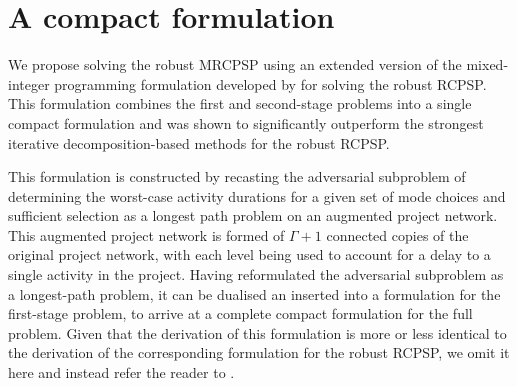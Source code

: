 \documentclass[a4paper,abstracton]{scrartcl}
\begin{document}
\section{A compact formulation}

We propose solving the robust MRCPSP using an extended version of the mixed-integer programming formulation developed by \cite{bold2021compact} for solving the robust RCPSP. This formulation combines the first and second-stage problems into a single compact formulation and was shown to significantly outperform the strongest iterative decomposition-based methods for the robust RCPSP.

This formulation is constructed by recasting the adversarial subproblem of determining the worst-case activity durations for a given set of mode choices and sufficient selection as a longest path problem on an augmented project network. This augmented project network is formed of $\Gamma+1$ connected copies of the original project network, with each level being used to account for a delay to a single activity in the project. Having reformulated the adversarial subproblem as a longest-path problem, it can be dualised an inserted into a formulation for the first-stage problem, to arrive at a complete compact formulation for the full problem. Given that the derivation of this formulation is more or less identical to the derivation of the corresponding formulation for the robust RCPSP, we omit it here and instead refer the reader to \cite{bold2021compact}.
\end{document}
